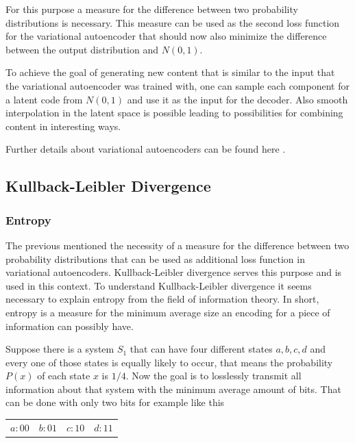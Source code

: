 For this purpose a measure for the
difference between two probability distributions is necessary. This measure can be used as the second loss
function for the variational autoencoder that should now also minimize the difference
between the output distribution and $N(0,1)$.

To achieve the goal of generating new content that is similar to the input that the variational 
autoencoder was trained with, one can sample each component for a latent code from $N(0,1)$ and
use it as the input for the decoder.
Also smooth interpolation in the latent space is possible leading to possibilities for combining
content in interesting ways.

Further details about variational autoencoders can be found here \parencite{2016-doersch-tutorial}.

\subsection{Kullback-Leibler Divergence} \label{KL-Divergence}

\subsubsection{Entropy}

The previous  mentioned the necessity of a measure for the difference between
two probability distributions that can be used as additional loss function in variational autoencoders.
Kullback-Leibler divergence serves this purpose and is used in this context.
To understand Kullback-Leibler divergence it seems necessary to explain entropy from
the field of information theory. In short, entropy is a measure for the minimum average size an
encoding for a piece of information can possibly have.

Suppose there is a system $S_1$ that can have four different states $a, b, c, d$
and every one of those states is equally likely to occur, that means the probability $P(x)$
of each state $x$ is $1/4$. Now the goal is to losslessly transmit all information about that system
with the minimum average amount of bits. That can be done with only two bits for example like this

\begin{center}
    \begin{tabular} {c c c c}
        $a: 00$ & $b: 01$ & $c: 10$ & $d: 11$
    \end{tabular}
\end{center}

